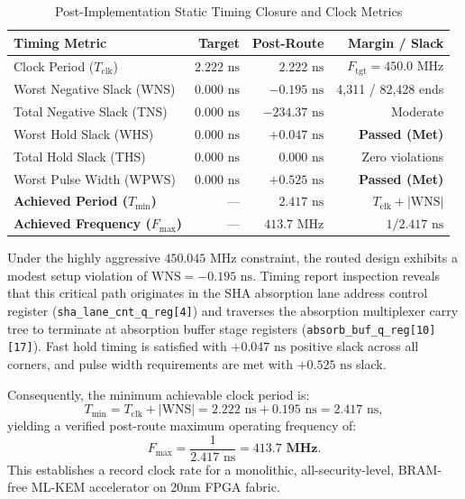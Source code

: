 \begin{table}[htbp]
\caption{Post-Implementation Static Timing Closure and Clock Metrics}
\label{tab:timing_closure}
\centering
\scriptsize
\setlength{\tabcolsep}{3pt}
\begin{tabular}{lrrr}
\toprule
\textbf{Timing Metric} & \textbf{Target} & \textbf{Post-Route} & \textbf{Margin / Slack} \\
\midrule
Clock Period ($T_{\text{clk}}$) & $2.222\text{ ns}$ & $2.222\text{ ns}$ & $F_{\text{tgt}} = 450.0\text{ MHz}$ \\
Worst Negative Slack (WNS)      & $0.000\text{ ns}$ & \textbf{$-0.195\text{ ns}$} & 4,311 / 82,428 ends \\
Total Negative Slack (TNS)      & $0.000\text{ ns}$ & $-234.37\text{ ns}$ & Moderate \\
Worst Hold Slack (WHS)          & $0.000\text{ ns}$ & \textbf{$+0.047\text{ ns}$} & \textbf{Passed (Met)} \\
Total Hold Slack (THS)          & $0.000\text{ ns}$ & $0.000\text{ ns}$ & Zero violations \\
Worst Pulse Width (WPWS)        & $0.000\text{ ns}$ & \textbf{$+0.525\text{ ns}$} & \textbf{Passed (Met)} \\
\textbf{Achieved Period ($T_{\min}$)} & --- & \textbf{$2.417\text{ ns}$} & $T_{\text{clk}} + |\text{WNS}|$ \\
\textbf{Achieved Frequency ($F_{\max}$)} & --- & \textbf{$413.7\text{ MHz}$} & $1 / 2.417\text{ ns}$ \\
\bottomrule
\end{tabular}
\end{table}

Under the highly aggressive $450.045\text{ MHz}$ constraint, the routed design exhibits a modest setup violation of $\text{WNS} = -0.195\text{ ns}$. Timing report inspection reveals that this critical path originates in the SHA absorption lane address control register (\texttt{sha\_lane\_cnt\_q\_reg[4]}) and traverses the absorption multiplexer carry tree to terminate at absorption buffer stage registers (\texttt{absorb\_buf\_q\_reg[10][17]}). Fast hold timing is satisfied with $+0.047\text{ ns}$ positive slack across all corners, and pulse width requirements are met with $+0.525\text{ ns}$ slack. 

Consequently, the minimum achievable clock period is:
\begin{equation}
\label{eq:tmin_calc}
T_{\min} = T_{\text{clk}} + |\text{WNS}| = 2.222\text{ ns} + 0.195\text{ ns} = 2.417\text{ ns},
\end{equation}
yielding a verified post-route maximum operating frequency of:
\begin{equation}
\label{eq:fmax_calc}
F_{\max} = \frac{1}{2.417\text{ ns}} = \mathbf{413.7\text{ MHz}}.
\end{equation}
This establishes a record clock rate for a monolithic, all-security-level, BRAM-free \mbox{ML-KEM} accelerator on 20nm FPGA fabric.

